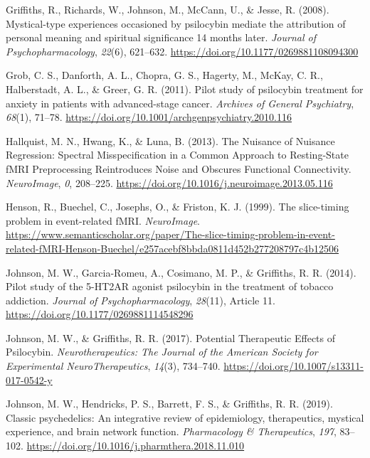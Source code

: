 \begin{CSLReferences}{1}{0}
Griffiths, R., Richards, W., Johnson, M., McCann, U., \& Jesse, R.
(2008). Mystical-type experiences occasioned by psilocybin mediate the
attribution of personal meaning and spiritual significance 14 months
later. \emph{Journal of Psychopharmacology}, \emph{22}(6), 621--632.
\url{https://doi.org/10.1177/0269881108094300}

Grob, C. S., Danforth, A. L., Chopra, G. S., Hagerty, M., McKay, C. R.,
Halberstadt, A. L., \& Greer, G. R. (2011). Pilot study of psilocybin
treatment for anxiety in patients with advanced-stage cancer.
\emph{Archives of General Psychiatry}, \emph{68}(1), 71--78.
\url{https://doi.org/10.1001/archgenpsychiatry.2010.116}

Hallquist, M. N., Hwang, K., \& Luna, B. (2013). The Nuisance of
Nuisance Regression: Spectral Misspecification in a Common Approach to
Resting-State fMRI Preprocessing Reintroduces Noise and Obscures
Functional Connectivity. \emph{NeuroImage}, \emph{0}, 208--225.
\url{https://doi.org/10.1016/j.neuroimage.2013.05.116}

Henson, R., Buechel, C., Josephs, O., \& Friston, K. J. (1999). The
slice-timing problem in event-related fMRI. \emph{NeuroImage}.
\url{https://www.semanticscholar.org/paper/The-slice-timing-problem-in-event-related-fMRI-Henson-Buechel/e257acebf8bbda0811d452b277208797c4b12506}

Johnson, M. W., Garcia-Romeu, A., Cosimano, M. P., \& Griffiths, R. R.
(2014). Pilot study of the 5-HT2AR agonist psilocybin in the treatment
of tobacco addiction. \emph{Journal of Psychopharmacology},
\emph{28}(11), Article 11.
\url{https://doi.org/10.1177/0269881114548296}

Johnson, M. W., \& Griffiths, R. R. (2017). Potential Therapeutic
Effects of Psilocybin. \emph{Neurotherapeutics: The Journal of the
American Society for Experimental NeuroTherapeutics}, \emph{14}(3),
734--740. \url{https://doi.org/10.1007/s13311-017-0542-y}

Johnson, M. W., Hendricks, P. S., Barrett, F. S., \& Griffiths, R. R.
(2019). Classic psychedelics: An integrative review of epidemiology,
therapeutics, mystical experience, and brain network function.
\emph{Pharmacology \& Therapeutics}, \emph{197}, 83--102.
\url{https://doi.org/10.1016/j.pharmthera.2018.11.010}


\end{CSLReferences}
